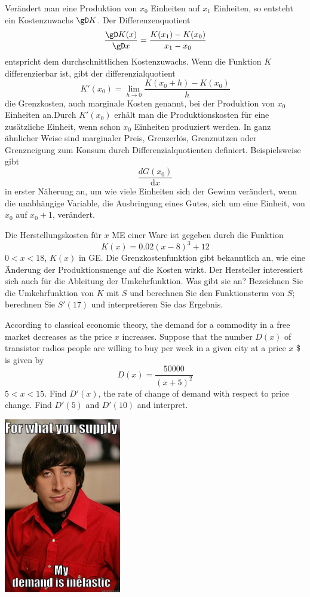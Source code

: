 \documentclass[%
11pt,%
twoside,%
titlepage,%
german,%
headsepline%
]{scrartcl}
\begin{document}
Ver\"andert man eine Produktion von $x_0$ Einheiten auf $x_1$ Einheiten, so entsteht ein Kostenzuwachs $\gD K$. Der Differenzenquotient
$$\frac{\gD K(x)}{\gD x}=\frac{K(x_1)-K(x_0)}{x_1-x_0}$$
entspricht dem durchschnittlichen Kostenzuwachs.
Wenn die Funktion $K$ differenzierbar ist, gibt der differenzialquotient
$$K'(x_0)=\lim_{h\to0}\frac{K(x_0+h)-K(x_0)}{h}$$
die Grenzkosten, auch marginale Kosten genannt, bei der Produktion von $x_0$ Einheiten an.Durch $K'(x_0)$ erh\"alt man die Produktionskosten f\"ur eine zus\"atzliche Einheit, wenn schon $x_0$ Einheiten produziert werden.
In ganz \"ahnlicher Weise sind marginaler Preis, Grenzerl\"os, Grenznutzen oder Grenzneigung zum Konsum durch Differenzialquotienten definiert. Beispielsweise gibt
$$\frac{dG(x_0)}{\mathrm{d}x}$$
in erster N\"aherung an, um wie viele Einheiten sich der Gewinn ver\"andert, wenn die unabh\"angige Variable, die Ausbringung eines Gutes, sich um eine Einheit, von $x_0$ auf $x_0 + 1$, ver\"andert.

\begin{ueb}
Die Herstellungskosten f\"ur $x$ ME einer Ware ist
gegeben durch die Funktion
$$K(x)=0.02(x-8)^3+12$$
$0<x<18$, $K(x)$ in GE. Die Grenzkostenfunktion gibt bekanntlich an, wie eine \"Anderung der Produktionsmenge auf die Kosten wirkt. Der Hersteller interessiert sich auch f\"ur die Ableitung der Umkehrfunktion. Was gibt sie an? Bezeichnen Sie die Umkehrfunktion von $K$ mit $S$ und berechnen Sie den Funktionsterm von $S$; berechnen Sie $S'(17)$ und interpretieren Sie das Ergebnis.
\end{ueb}

\begin{ueb}
According to classical economic theory, the demand for a commodity in a free market decreases as the price $x$ increases. Suppose that the number $D(x)$ of transistor radios people are willing to buy per week in a given city at a price $x$ \$ is given by
$$D(x)=\frac{50000}{(x+5)^2}$$
$5<x<15$. Find $D'(x)$, the rate of change of demand with
respect to price change. Find $D'(5)$ and $D'(10)$ and interpret.
\end{ueb}

\medskip

\begin{center}
\includegraphics[width=0.382\textwidth]{pictures/inelastic}
\end{center}
\end{document}

